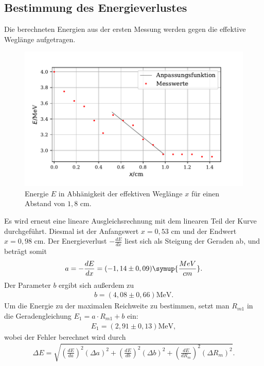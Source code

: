 \subsection{Bestimmung des Energieverlustes}
Die berechneten Energien aus der ersten Messung werden gegen die effektive Weglänge aufgetragen. 
\begin{figure}[H]
  \centering
  \includegraphics{plot3.pdf}
  \caption{Energie $E$ in Abhänigkeit der effektiven Weglänge $x$ für einen Abstand von $1,8$ $\si{\cm}$. }
  \label{fig:plot}
\end{figure}
\noindent Es wird erneut eine lineare Ausgleichsrechnung mit dem linearen Teil der Kurve durchgeführt. Diesmal ist der Anfangswert $x=0,53$ $\si{\cm}$ und der Endwert $x=0,98$ $\si{\cm}$.  Der Energieverlust $-\frac{dE}{dx}$
liest sich als Steigung der Geraden ab, und beträgt somit
\begin{align*}
a = -\frac{dE}{dx} = (-1,14 \pm 0,09) \symup{\frac{MeV}{cm}} .
\end{align*}
Der Parameter $b$ ergibt sich außerdem zu
\begin{align*}
b = (4,08 \pm 0,66) \si{\MeV}.
\end{align*}
Um die Energie zu der maximalen Reichweite zu bestimmen, setzt man $R_{m1}$ in die Geradengleichung $E_1 = a \cdot R_{m1} + b$ ein:
\begin{align*}
E_1 = (2,91 \pm 0,13) \si{\MeV},
\end{align*}
wobei der Fehler berechnet wird durch
\begin{align*}
\Delta E = \sqrt{(\frac{dE}{da})^2 (\Delta a)^2 + (\frac{dE}{db})^2 (\Delta b)^2 + (\frac{dE}{dR_m})^2 (\Delta R_m)^2}.
\end{align*}


